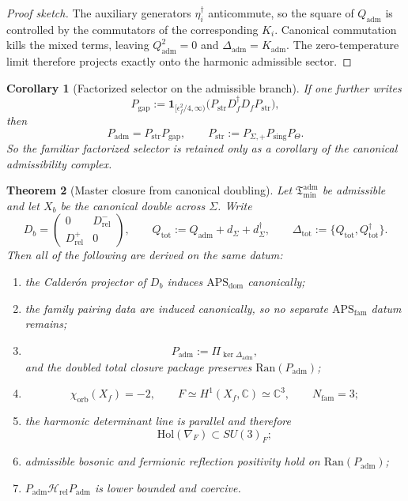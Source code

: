 \documentclass[11pt,a4paper]{article}
\newtheorem{theorem}{Theorem}[section]
\newtheorem{corollary}[theorem]{Corollary}
\theoremstyle{definition}
\theoremstyle{remark}
\newcommand{\Seam}{\Sigma}
\newcommand{\Hrel}{\mathcal H_{\mathrm{rel}}}
\newcommand{\Kadm}{K_{\mathrm{adm}}}
\newcommand{\Tmin}{\mathfrak T_{\mathrm{min}}}
\newcommand{\APSdom}{\mathrm{APS}_{\mathrm{dom}}}
\newcommand{\APSfam}{\mathrm{APS}_{\mathrm{fam}}}
\newcommand{\Padm}{P_{\mathrm{adm}}}
\begin{document}
\begin{proof}[Proof sketch]
The auxiliary generators $\eta_i^\dagger$ anticommute, so the square of $Q_{\mathrm{adm}}$
is controlled by the commutators of the corresponding $K_i$. Canonical commutation kills the
mixed terms, leaving $Q_{\mathrm{adm}}^2=0$ and $\Delta_{\mathrm{adm}}=\Kadm$. The
zero-temperature limit therefore projects exactly onto the harmonic admissible sector.
\end{proof}

\begin{corollary}[Factorized selector on the admissible branch]
\label{cor:factorized-admissibility-selector}
If one further writes
\[
P_{\mathrm{gap}}:=\mathbf 1_{[\epsilon_f^2/4,\infty)}\!\bigl(P_{\mathrm{str}}D_f^\dagger D_f P_{\mathrm{str}}\bigr),
\]
then
\[
\Padm=P_{\mathrm{str}}P_{\mathrm{gap}},
\qquad
P_{\mathrm{str}}:=P_{\Seam,+}P_{\mathrm{sing}}P_\Theta.
\]
So the familiar factorized selector is retained only as a corollary of the canonical
admissibility complex.
\end{corollary}

\begin{theorem}[Master closure from canonical doubling]
\label{thm:master-closure}
\label{ass:remaining-closure-inputs}
Let $\Tmin^{\mathrm{adm}}$ be admissible and let $X_b$ be the canonical double across $\Seam$.
Write
\[
D_b=
\begin{pmatrix}
0&D_{\mathrm{rel}}^-\\
D_{\mathrm{rel}}^+&0
\end{pmatrix},
\qquad
Q_{\mathrm{tot}}:=Q_{\mathrm{adm}}+d_\Sigma+d_\Sigma^\dagger,
\qquad
\Delta_{\mathrm{tot}}:=\{Q_{\mathrm{tot}},Q_{\mathrm{tot}}^\dagger\}.
\]
Then all of the following are derived on the same datum:
\begin{enumerate}[label=(\arabic*), leftmargin=1.5em, topsep=3pt, itemsep=2pt]
    \item the Calder\'on projector of $D_b$ induces $\APSdom$ canonically;
    \item the family pairing data are induced canonically, so no separate $\APSfam$ datum remains;
    \item
    \[
    \Padm:=\Pi_{\ker \Delta_{\mathrm{adm}}},
    \]
    and the doubled total closure package preserves $\mathrm{Ran}(\Padm)$;
    \item
    \[
    \chi_{\mathrm{orb}}(X_f)=-2,
    \qquad
    F\simeq H^1(X_f,\mathbb C)\simeq \mathbb C^3,
    \qquad
    N_{\mathrm{fam}}=3;
    \]
    \item the harmonic determinant line is parallel and therefore
    \[
    \mathrm{Hol}(\nabla_F)\subset SU(3)_F;
    \]
    \item admissible bosonic and fermionic reflection positivity hold on $\mathrm{Ran}(\Padm)$;
    \item $\Padm\Hrel\Padm$ is lower bounded and coercive.
\end{enumerate}
\end{theorem}
\end{document}
